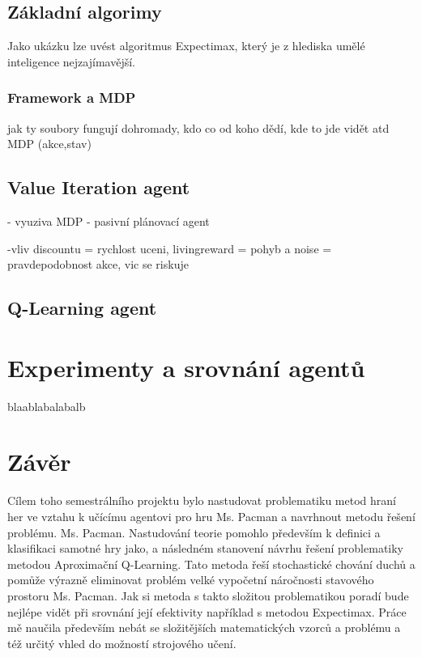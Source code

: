 \section{Základní algorimy}
Jako ukázku lze uvést algoritmus Expectimax, který je z hlediska umělé inteligence nejzajímavější.

\subsection{Framework a MDP}
jak ty soubory fungují dohromady, kdo co od koho dědí, kde to jde vidět atd
MDP (akce,stav)

\section{Value Iteration agent}
- vyuziva MDP
- pasivní plánovací agent

-vliv discountu = rychlost uceni, livingreward = pohyb a noise = pravdepodobnost akce, vic se riskuje

\section{Q-Learning agent}

\chapter{Experimenty a srovnání agentů}
blaablabalabalb

\chapter{Závěr}
Cílem toho semestrálního projektu bylo nastudovat problematiku metod hraní her ve vztahu k učícímu agentovi pro hru Ms. Pacman a navrhnout metodu řešení problému. Ms. Pacman. Nastudování teorie pomohlo především k definici a klasifikaci samotné hry jako, a následném stanovení návrhu řešení problematiky metodou Aproximační Q-Learning. Tato metoda řeší stochastické chování duchů a pomůže výrazně eliminovat problém velké vypočetní náročnosti stavového prostoru Ms. Pacman. Jak si metoda s takto složitou problematikou poradí bude nejlépe vidět při srovnání její efektivity například s metodou Expectimax. Práce mě naučila především nebát se složitějších matematických vzorců a problému a též určitý vhled do možností strojového učení.

